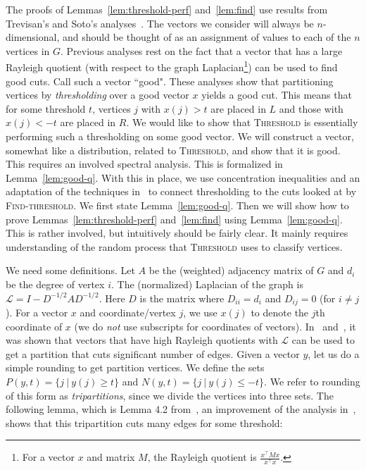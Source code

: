 \documentclass[11pt]{article}
\def\lap{{\mathcal L}}
\newcommand\Threshold{\textsc{Threshold}\xspace}
\newcommand\Find{\textsc{Find-threshold}\xspace}
\def\Dhalfinv{D^{-1/2}}
\begin{document}
The proofs of Lemmas~\ref{lem:threshold-perf} and~\ref{lem:find} use
results from Trevisan's and Soto's analyses~\cite{Tre09,Sot09}.
The vectors we consider will always be $n$-dimensional,
and should be thought of as an assignment of values to each of the $n$ vertices
in $G$.
Previous analyses rest on the fact that a vector
that has a large Rayleigh quotient
(with respect to the graph Laplacian\footnote{For a vector $x$
and matrix $M$, the Rayleigh quotient is $\frac{x^\top M x}{x^\top x}$.}) can be
used to find good cuts. Call such a vector ``good".
These analyses show that partitioning vertices by \emph{thresholding} over
a good vector $x$ yields a good cut. This means that for some threshold $t$,
vertices $j$ with $x(j) > t$ are placed in $L$ and those with $x(j) < -t$
are placed in $R$.
We would like to show that {\Threshold} is
essentially performing such a thresholding on some good vector. We will construct a vector,
somewhat like a distribution, related to {\Threshold}, and show that it is
good. This requires an involved spectral
analysis. This is formalized in Lemma~\ref{lem:good-q}. With this
in place, we use concentration inequalities and an adaptation of the techniques
in~\cite{Sot09} to connect thresholding to the cuts looked at by {\Find}.
We first state Lemma~\ref{lem:good-q}. Then we will show how
to prove Lemmas~\ref{lem:threshold-perf} and~\ref{lem:find} using Lemma~\ref{lem:good-q}.
This is rather involved, but intuitively should be fairly clear.
It mainly requires understanding of
the random process that {\Threshold} uses to classify vertices.

We need some
definitions. Let $A$ be the (weighted) adjacency matrix of $G$ and $d_i$
be the degree of vertex $i$.  The (normalized) Laplacian of the graph is $\lap
= I - \Dhalfinv A\Dhalfinv$. Here $D$ is the matrix where $D_{ii} = d_i$ and
$D_{ij} = 0$ (for $i \neq j$). For a vector $x$ and coordinate/vertex $j$, we use $x(j)$
to denote the $j$th coordinate of $x$ (we do \emph{not} use subscripts
for coordinates of vectors).
In~\cite{Tre09} and~\cite{Sot09}, it was shown
that vectors that have high Rayleigh quotients with $\lap$
can be used to get a
partition that cuts significant number of edges. Given a vector $y$, let us do
a simple rounding to get partition vertices. We define the sets $ P(y,t) = \{
j\ |\ y(j) \geq t\}$ and $N(y, t) = \{j\ |\ y(j) \leq -t\} $. We refer to
rounding of this form as \emph{tripartitions}, since we divide the vertices
into three sets. The following lemma, which is Lemma 4.2 from~\cite{Sot09}, an
improvement of the analysis in~\cite{Tre09}, shows that this tripartition cuts
many edges for some threshold:
\end{document}
